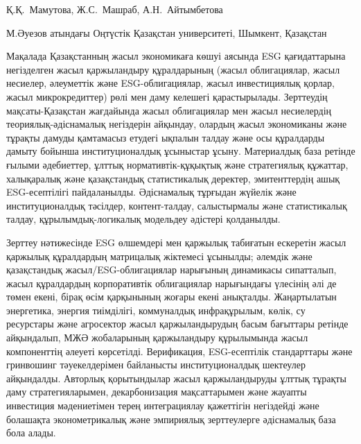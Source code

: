\vspace{1em}
\begin{header}

Қ.Қ.~Мамутова,
Ж.С.~Машраб\envelope,
А.Н.~Айтымбетова
\end{header}

\begin{affil}
М.Әуезов атындағы Оңтүстік Қазақстан университеті, Шымкент, Қазақстан

\end{affil}

Мақалада Қазақстанның жасыл экономикаға көшуі аясында ESG қағидаттарына
негізделген жасыл қаржыландыру құралдарының (жасыл облигациялар, жасыл
несиелер, әлеуметтік және ESG-облигациялар, жасыл инвестициялық қорлар,
жасыл микрокредиттер) рөлі мен даму келешегі қарастырылады. Зерттеудің
мақсаты-Қазақстан жағдайында жасыл облигациялар мен жасыл несиелердің
теориялық-әдіснамалық негіздерін айқындау, олардың жасыл экономиканы
және тұрақты дамуды қамтамасыз етудегі ықпалын талдау және осы
құралдарды дамыту бойынша институционалдық ұсыныстар ұсыну. Материалдық
база ретінде ғылыми әдебиеттер, ұлттық нормативтік-құқықтық және
стратегиялық құжаттар, халықаралық және қазақстандық статистикалық
деректер, эмитенттердің ашық ESG-есептілігі пайдаланылды. Әдіснамалық
тұрғыдан жүйелік және институционалдық тәсілдер, контент-талдау,
салыстырмалы және статистикалық талдау, құрылымдық-логикалық модельдеу
әдістері қолданылды.

Зерттеу нәтижесінде ESG өлшемдері мен қаржылық табиғатын ескеретін жасыл
қаржылық құралдардың матрицалық жіктемесі ұсынылды; әлемдік және
қазақстандық жасыл/ESG-облигациялар нарығының динамикасы сипатталып,
жасыл құралдардың корпоративтік облигациялар нарығындағы үлесінің әлі де
төмен екені, бірақ өсім қарқынының жоғары екені анықталды. Жаңартылатын
энергетика, энергия тиімділігі, коммуналдық инфрақұрылым, көлік, су
ресурстары және агросектор жасыл қаржыландырудың басым бағыттары ретінде
айқындалып, МЖӘ жобаларының қаржыландыру құрылымында жасыл компоненттің
әлеуеті көрсетілді. Верификация, ESG-есептілік стандарттары және
гринвошинг тәуекелдерімен байланысты институционалдық шектеулер
айқындалды. Авторлық қорытындылар жасыл қаржыландыруды ұлттық тұрақты
даму стратегияларымен, декарбонизация мақсаттарымен және жауапты
инвестиция мәдениетімен терең интеграциялау қажеттігін негіздейді және
болашақта эконометрикалық және эмпириялық зерттеулерге әдіснамалық база
бола алады.

